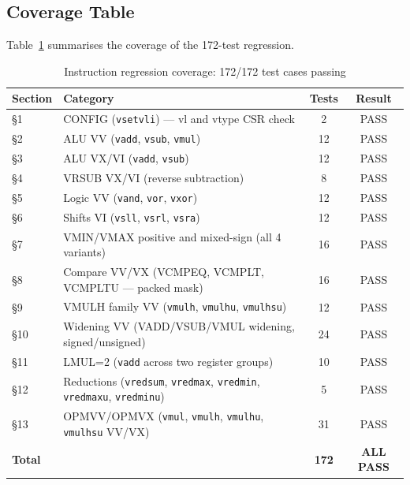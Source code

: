 \subsection{Coverage Table}

Table~\ref{tab:regression_coverage} summarises the coverage of the 172-test regression.

\begin{table}[H]
  \centering
  \caption{Instruction regression coverage: 172/172 test cases passing}
  \label{tab:regression_coverage}
  \begin{tabular}{llcc}
    \toprule
    \textbf{Section} & \textbf{Category} & \textbf{Tests} & \textbf{Result} \\
    \midrule
    §1  & CONFIG (\texttt{vsetvli}) — vl and vtype CSR check         & 2  & PASS \\
    §2  & ALU VV (\texttt{vadd}, \texttt{vsub}, \texttt{vmul})       & 12 & PASS \\
    §3  & ALU VX/VI (\texttt{vadd}, \texttt{vsub})                   & 12 & PASS \\
    §4  & VRSUB VX/VI (reverse subtraction)                          & 8  & PASS \\
    §5  & Logic VV (\texttt{vand}, \texttt{vor}, \texttt{vxor})      & 12 & PASS \\
    §6  & Shifts VI (\texttt{vsll}, \texttt{vsrl}, \texttt{vsra})    & 12 & PASS \\
    §7  & VMIN/VMAX positive and mixed-sign (all 4 variants)         & 16 & PASS \\
    §8  & Compare VV/VX (VCMPEQ, VCMPLT, VCMPLTU — packed mask)     & 16 & PASS \\
    §9  & VMULH family VV (\texttt{vmulh}, \texttt{vmulhu}, \texttt{vmulhsu}) & 12 & PASS \\
    §10 & Widening VV (VADD/VSUB/VMUL widening, signed/unsigned)    & 24 & PASS \\
    §11 & LMUL=2 (\texttt{vadd} across two register groups)         & 10 & PASS \\
    §12 & Reductions (\texttt{vredsum}, \texttt{vredmax}, \texttt{vredmin}, \texttt{vredmaxu}, \texttt{vredminu}) & 5 & PASS \\
    §13 & OPMVV/OPMVX (\texttt{vmul}, \texttt{vmulh}, \texttt{vmulhu}, \texttt{vmulhsu} VV/VX) & 31 & PASS \\
    \midrule
    \multicolumn{2}{l}{\textbf{Total}} & \textbf{172} & \textbf{ALL PASS} \\
    \bottomrule
  \end{tabular}
\end{table}

